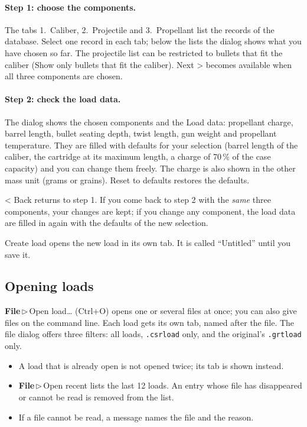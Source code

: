 \documentclass[11pt,a4paper]{article}
\newcommand{\ui}[1]{\textsf{#1}}
\newcommand{\menu}[1]{\textsf{\textbf{#1}}}
\newcommand{\sep}{\,$\triangleright$\,}
\newcommand{\file}[1]{\texttt{#1}}
\begin{document}
\paragraph{Step 1: choose the components.} The tabs \ui{1.\ Caliber}, \ui{2.\ Projectile} and \ui{3.\ Propellant} list the records of the database. Select one record in each
tab; below the lists the dialog shows what you have chosen so far. The projectile list can be restricted to bullets that fit the caliber
(\ui{Show only bullets that fit the caliber}). \ui{Next >} becomes available when all three components are chosen.

\paragraph{Step 2: check the load data.} The dialog shows the chosen components and the \ui{Load data}: propellant charge, barrel length, bullet seating depth,
twist length, gun weight and propellant temperature. They are filled with defaults for your selection (barrel length of the caliber, the cartridge at its maximum length, a charge of
70\,\% of the case capacity) and you can change them freely. The charge is also shown in the other mass unit (grams or grains).
\ui{Reset to defaults} restores the defaults.

\ui{< Back} returns to step 1. If you come back to step 2 with the \emph{same} three components, your changes are kept; if you change any component, the load data are filled in again
with the defaults of the new selection.

\ui{Create load} opens the new load in its own tab. It is called ``Untitled'' until you save it.

\subsection{Opening loads}
\menu{File}\sep\ui{Open load\dots} (Ctrl+O) opens one or several files at once; you can also give files on the command line. Each load gets its own tab,
named after the file. The file dialog offers three filters: all loads, \file{.csrload} only, and the original's \file{.grtload} only.
\begin{itemize}
  \item A load that is already open is not opened twice; its tab is shown instead.
  \item \menu{File}\sep\ui{Open recent} lists the last 12 loads. An entry whose file has disappeared or cannot be read is removed from the list.
  \item If a file cannot be read, a message names the file and the reason.
\end{itemize}
\end{document}
